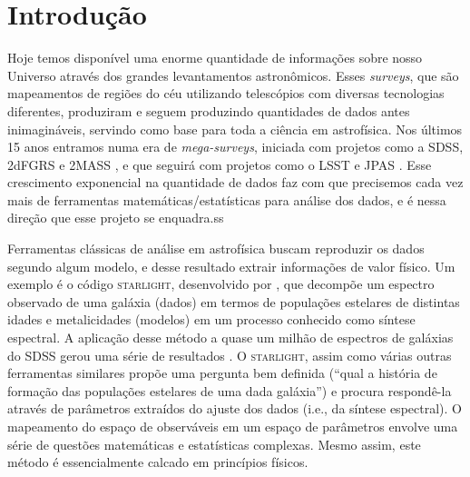 \documentclass[a4paper,12pt]{article}
\def\starlight{\textsc{starlight}\xspace}      %
\def\SDSS{SDSS\xspace}           %
\begin{document}
\section{Introdução}
Hoje temos disponível uma enorme quantidade de informações sobre nosso Universo através dos grandes levantamentos astronômicos. Esses {\em surveys},
que são mapeamentos de regiões do céu utilizando telescópios com diversas tecnologias diferentes, produziram e seguem produzindo quantidades de dados
antes inimagináveis, servindo como base para toda a ciência em astrofísica. Nos últimos 15 anos entramos numa era de {\em mega-surveys}, iniciada com
projetos como a \SDSS \citep{York2000}, 2dFGRS \citep{Colless1999} e 2MASS \citep{Skrutskie2006}, e que seguirá com projetos como o LSST
\citep{Ivezic2008} e JPAS \citep{JPAS2014}. Esse crescimento exponencial na quantidade de dados faz com que precisemos cada vez mais de ferramentas
matemáticas/estatísticas para análise dos dados, e é nessa direção que esse projeto se enquadra.ss
	
Ferramentas clássicas de análise em astrofísica buscam reproduzir os dados segundo algum modelo, e desse resultado extrair informações de valor
físico. Um exemplo é o código \starlight, desenvolvido por \citet{CidFernandes2005}, que decompõe um espectro observado de uma galáxia (dados) em
termos de populações estelares de distintas idades e metalicidades (modelos) em um processo conhecido como síntese espectral. A aplicação desse método
a quase um milhão de espectros de galáxias do \SDSS gerou uma série de resultados \citep[e.g., ][]{Asari2007, Asari2009, CidFernandes2007,
Mateus2007}. O \starlight, assim como várias outras ferramentas similares \citep{Panter2003, Gallazzi2005, Ocvirk2006} propõe uma pergunta bem
definida (``qual a história de formação das populações estelares de uma dada galáxia'') e procura respondê-la através de parâmetros extraídos do
ajuste dos dados (i.e., da síntese espectral). O mapeamento do espaço de observáveis em um espaço de parâmetros envolve uma série de questões
matemáticas e estatísticas complexas. Mesmo assim, este método é essencialmente calcado em princípios físicos.
\end{document}
